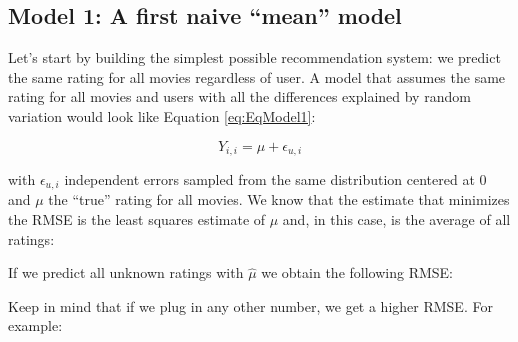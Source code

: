 \documentclass[
]{article}
\newenvironment{Shaded}{}{}
\newcommand{\DecValTok}[1]{\textcolor[rgb]{0.25,0.63,0.44}{#1}}
\newcommand{\FloatTok}[1]{\textcolor[rgb]{0.25,0.63,0.44}{#1}}
\newcommand{\FunctionTok}[1]{\textcolor[rgb]{0.02,0.16,0.49}{#1}}
\newcommand{\NormalTok}[1]{#1}
\newcommand{\OtherTok}[1]{\textcolor[rgb]{0.00,0.44,0.13}{#1}}
\newcommand{\SpecialCharTok}[1]{\textcolor[rgb]{0.25,0.44,0.63}{#1}}
\begin{document}
\newpage

\hypertarget{model-1-a-first-naive-mean-model}{%
\subsection{Model 1: A first naive ``mean''
model}\label{model-1-a-first-naive-mean-model}}

Let's start by building the simplest possible recommendation system: we
predict the same rating for all movies regardless of user. A model that
assumes the same rating for all movies and users with all the
differences explained by random variation would look like Equation
\ref{eq:EqModel1}:

%
\par

\label{eq:EqModel1} \begin{equation}
  Y_{i,i}=\mu+\epsilon_{u,i}
\end{equation}

with \(\epsilon_{u,i}\) independent errors sampled from the same
distribution centered at 0 and \(\mu\) the ``true'' rating for all
movies. We know that the estimate that minimizes the RMSE is the least
squares estimate of \(\mu\) and, in this case, is the average of all
ratings:

\begin{Shaded}
\end{Shaded}

If we predict all unknown ratings with \(\hat\mu\) we obtain the
following RMSE:

\begin{Shaded}
\end{Shaded}

Keep in mind that if we plug in any other number, we get a higher RMSE.
For example:
\end{document}
